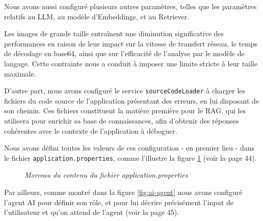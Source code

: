 \documentclass[12pt,a4paper]{report}
\begin{document}
	Nous avons aussi configuré plusieurs autres paramètres, telles que les paramètres relatifs au LLM, au modèle d'Embeddings, et au Retriever.
	
	Les images de grande taille entraînent une diminution significative des performances en raison de leur impact sur la vitesse de transfert réseau, le temps de décodage en base64, ainsi que sur l'efficacité de l'analyse par le modèle de langage. Cette contrainte nous a conduit à imposer une limite stricte à leur taille maximale.
	
	D'autre part, nous avons configuré le service \verb|sourceCodeLoader| à charger les fichiers du code source de l'application présentant des erreurs, en lui disposant de son chemin. Ces fichiers constituent la matière première pour le RAG, qui les utilisera pour enrichir sa base de connaissances, afin d'obtenir des réponses cohérentes avec le contexte de l'application à déboguer.
	
	Nous avons défini toutes les valeurs de ces configuration - en premier lieu - dans le fichier \verb|application.properties|, comme l'illustre la figure \ref{fig:properties} (voir la page 44).
	
	\begin{figure}[H]
		\centering
		\caption{\textit{Morceau du contenu du fichier application.properties}}
		\label{fig:properties}
	\end{figure}
	
	Par ailleurs, comme montré dans la figure \ref{fig:ai-agent} nous avons configuré l'agent AI pour définir son rôle, et pour lui décrire précisément l'input de l'utilisateur et qu'on attend de l'agent (voir la page 45).
	
\end{document}
